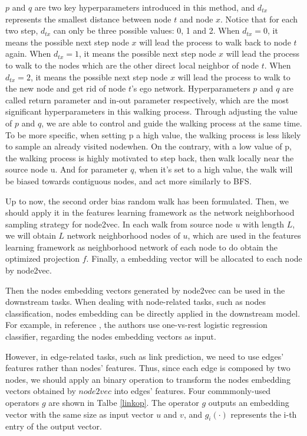 \documentclass[sigconf]{acmart}
\begin{document}
$p$ and $q$ are two key hyperparameters introduced in this method, and $d_{tx}$ represents the smallest distance between node $t$ and node $x$. Notice that for each two step, $d_{tx}$ can only be three possible values: 0, 1 and 2. When $d_{tx}=0$, it means the possible next step node $x$ will lead the process to walk back to node $t$ again. When $d_{tx}=1$, it means the possible next step node $x$ will lead the process to walk to the nodes which are the other direct local neighbor of node $t$. When $d_{tx}=2$, it means the possible next step node $x$ will lead the process to walk to the new node and get rid of node $t$'s ego network. Hyperparameters $p$ and $q$ are called return parameter and in-out parameter respectively, which are the most significant hyperparameters in this walking process. Through adjusting the value of $p$ and $q$, we are able to control and guide the walking process at the same time. To be more specific, when setting p a high value, the walking process is less likely to sample an already visited nodewhen. On the contrary, with a low value of p, the walking process is highly motivated to step back, then walk locally near the source node u. And for parameter $q$, when it's set to a high value, the walk will be biased towards contiguous nodes, and act more similarly to BFS. 

Up to now, the second order bias random walk has been formulated. Then, we should apply it in the features learning framework as the network neighborhood sampling strategy for node2vec. In each walk from source node $u$ with length $L$, we will obtain $L$ network neighborhood nodes of $u$, which are used in the features learning framework as neighborhood network of each node to do obtain the optimized projection $f$. Finally, a embedding vector will be allocated to each node by node2vec.

Then the nodes embedding vectors generated by node2vec can be used in the downstream tasks. When dealing with node-related tasks, such as nodes classification, nodes embedding can be directly applied in the downstream model. For example, in reference \cite{node2vec}, the authors use one-vs-rest logistic regression classifier, regarding the nodes embedding vectors as input.

However, in edge-related tasks, such as link prediction, we need to use edges' features rather than nodes' features. Thus, since each edge is composed by two nodes, we should apply an binary operation to transform the nodes embedding vectors obtained by $node2vec$ into edges' features. Four commmonly-used operators $g$ are shown in Talbe \ref{linkop}. The operator $g$ outputs an embedding vector with the same size as input vector $u$ and $v$, and $g_i(\cdot)$ represents the i-th entry of the output vector. 
\end{document}
